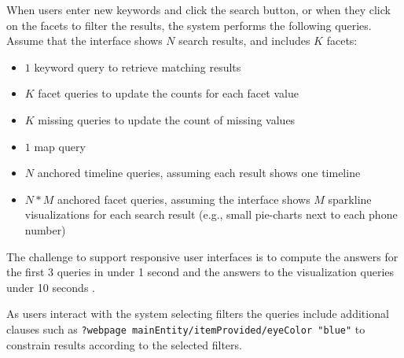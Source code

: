 When users enter new keywords and click the search button, or when they click on the facets to filter the results, the system performs the following queries.
Assume that the interface shows $N$ search results, and includes $K$ facets:
\begin{itemize}
\item $1$ keyword query to retrieve matching results
\item $K$ facet queries to update the counts for each facet value
\item $K$ missing queries to update the count of missing values
\item $1$ map query
\item $N$ anchored timeline queries, assuming each result shows one timeline
\item $N*M$ anchored facet queries, assuming the interface shows $M$ sparkline visualizations for each search result (e.g., small pie-charts next to each phone number) 
\end{itemize}
The challenge to support responsive user interfaces is to compute the answers for the first 3 queries in under 1 second and the answers to the visualization queries under 10 seconds \cite{nielsen1994usability}.

As users interact with the system selecting filters the queries include additional clauses such as
\verb|?webpage mainEntity/itemProvided/eyeColor "blue"|
to constrain results according to the selected filters.